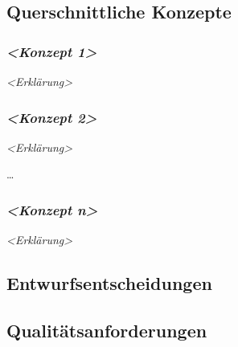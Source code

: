 



\subsection{Querschnittliche Konzepte}\label{section-concepts}

\subsubsection{\texorpdfstring{\emph{\textless{}Konzept
1\textgreater{}}}{\textless{}Konzept 1\textgreater{}}}\label{__emphasis_konzept_1_emphasis}

\emph{\textless{}Erklärung\textgreater{}}

\subsubsection{\texorpdfstring{\emph{\textless{}Konzept
2\textgreater{}}}{\textless{}Konzept 2\textgreater{}}}\label{__emphasis_konzept_2_emphasis}

\emph{\textless{}Erklärung\textgreater{}}

\ldots{}

\subsubsection{\texorpdfstring{\emph{\textless{}Konzept
n\textgreater{}}}{\textless{}Konzept n\textgreater{}}}\label{__emphasis_konzept_n_emphasis}

\emph{\textless{}Erklärung\textgreater{}}

\subsection{Entwurfsentscheidungen}\label{section-design-decisions}

\subsection{Qualitätsanforderungen}\label{section-quality-scenarios}

